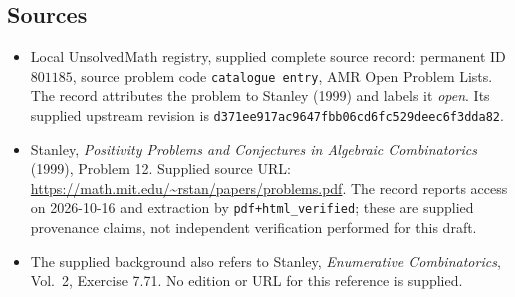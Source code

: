 \documentclass[11pt]{article}
\begin{document}
\subsection{Sources}
\begin{itemize}
\item Local UnsolvedMath registry, supplied complete source record: permanent ID \(801185\), source problem code \texttt{catalogue entry}, AMR Open Problem Lists. The record attributes the problem to Stanley (1999) and labels it \emph{open}. Its supplied upstream revision is \texttt{d371ee917ac9647fbb06cd6fc529deec6f3dda82}.
\item Stanley, \emph{Positivity Problems and Conjectures in Algebraic Combinatorics} (1999), Problem 12. Supplied source URL: \url{https://math.mit.edu/~rstan/papers/problems.pdf}. The record reports access on 2026-10-16 and extraction by \texttt{pdf+html\_verified}; these are supplied provenance claims, not independent verification performed for this draft.
\item The supplied background also refers to Stanley, \emph{Enumerative Combinatorics}, Vol.~2, Exercise 7.71. No edition or URL for this reference is supplied.
\end{itemize}
\end{document}
